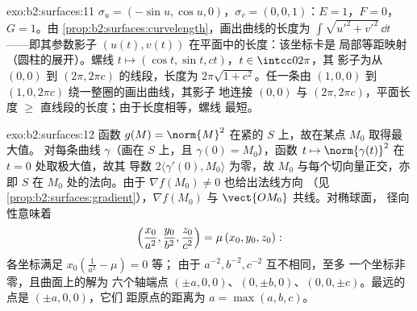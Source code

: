 \begin{solution}{exo:b2:surfaces:11}
$\sigma_u = (-\sin u, \cos u, 0)$，$\sigma_v = (0, 0, 1)$：$E
= 1$，$F = 0$，$G = 1$。由
\cref{prop:b2:surfaces:curvelength}，画出曲线的长度为
$\int\sqrt{u'^2 + v'^2}\,\dd t$——即其参数影子
$(u(t), v(t))$ 在平面中的长度：该坐标卡是
局部等距映射（圆柱的展开）。螺线
$t \mapsto (\cos t, \sin t, ct)$，$t \in \intcc0{2\pi}$，其
影子为从 $(0,0)$ 到 $(2\pi, 2\pi c)$ 的线段，长度为
$2\pi\sqrt{1 + c^2}$。任一条由 $(1,0,0)$ 到 $(1,
0, 2\pi c)$ 绕一整圈的画出曲线，其影子
地连接 $(0, 0)$ 与 $(2\pi, 2\pi c)$，平面长度 $\geq$
直线段的长度；由于长度相等，螺线
最短。
\end{solution}

\begin{solution}{exo:b2:surfaces:12}
函数 $g(M) = \norm{M}^2$ 在紧的
$S$ 上，故在某点 $M_0$ 取得最大值。
对每条曲线 $\gamma$（画在 $S$ 上，且 $\gamma(0) = M_0$），函数 $t
\mapsto \norm{\gamma(t)}^2$ 在 $t = 0$ 处取极大值，故其
导数 $2\langle\gamma'(0), M_0\rangle$ 为零，故 $M_0$
与每个切向量正交，亦即 $S$ 在
$M_0$ 处的法向。由于 $\nabla f(M_0) \neq 0$ 也给出法线方向
（见\cref{prop:b2:surfaces:gradient}），$\nabla f(M_0)$ 与
$\vect{OM_0}$ 共线。对椭球面，
径向性意味着
\[
\Bigl(\frac{x_0}{a^2}, \frac{y_0}{b^2},
\frac{z_0}{c^2}\Bigr) = \mu\,(x_0, y_0, z_0) :
\]
各坐标满足 $x_0(\frac1{a^2} - \mu) = 0$ 等；
由于 $a^{-2}, b^{-2}, c^{-2}$ 互不相同，至多
一个坐标非零，且曲面上的解为
六个轴端点 $(\pm a, 0, 0)$、$(0, \pm b, 0)$、$(0,
0, \pm c)$。最远的点是 $(\pm a, 0, 0)$，它们
距原点的距离为 $a = \max(a,b,c)$。
\end{solution}

